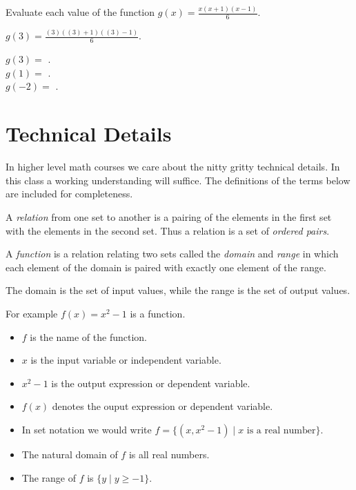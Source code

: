 \documentclass{ximera}
\begin{document}
\begin{question}
Evaluate each value of the function $g(x)=\frac{x(x+1)(x-1)}{6}$.

\begin{hint}
$g(3)=\frac{(3)\left((3)+1\right)\left((3)-1\right)}{6}$. 
\end{hint}
$g(3)=$ .\\
$g(1)=$ .\\
$g(-2)=$ .

\end{question}


\section*{Technical Details}
In higher level math courses we care about the nitty gritty technical details. In this class a working understanding will suffice. The definitions of the terms below are included for completeness.


A \emph{relation} from one set to another is a pairing of the elements in the first set with the elements in the second set. Thus a relation is a set of \emph{ordered pairs}.

A \emph{function} is a relation relating two sets called the \emph{domain} and \emph{range} in which each element of the domain is paired with exactly one element of the range. 

The domain is the set of input values, while the range is the set of output values.

For example $f(x)=x^2-1$ is a function.
\begin{itemize}
\item $f$ is the name of the function.
\item $x$ is the input variable or independent variable.
\item  $x^2-1$ is the output expression or dependent variable.
\item $f(x)$ denotes the ouput expression or dependent variable.
\item In set notation we would write $f=\{(x,x^2-1)\mid x\text{ is a real number}\}$.
\item The natural domain of $f$ is all real numbers.
\item The range of $f$ is $\{y\mid y\ge-1\}$.
\end{itemize}
\end{document}

